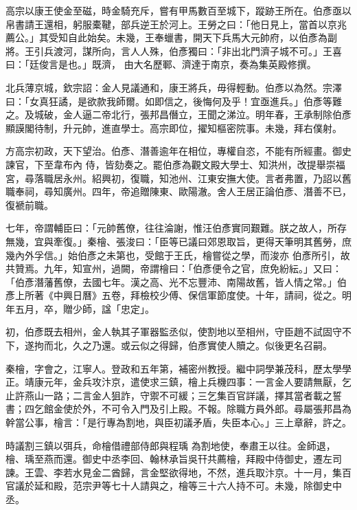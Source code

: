\begin{pinyinscope}
 高宗以康王使金至磁，時金騎充斥，嘗有甲馬數百至城下，蹤跡王所在。伯彥亟以帛書請王還相，躬服橐鞬，部兵逆王於河上。王勞之曰：「他日見上，當首以京兆薦公。」其受知自此始矣。未幾，王奉蠟書，開天下兵馬大元帥府，以伯彥為副將。王引兵渡河，謀所向，言人人殊，伯彥獨曰：「非出北門濟子城不可。」王喜曰：「廷俊言是也。」既濟，
 由大名歷鄆、濟達于南京，奏為集英殿修撰。



 北兵薄京城，欽宗詔：金人見議通和，康王將兵，毋得輕動。伯彥以為然。宗澤曰：「女真狂譎，是欲款我師爾。如即信之，後悔何及乎！宜亟進兵。」伯彥等難之。及城破，金人逼二帝北行，張邦昌僭立，王聞之涕泣。明年春，王承制除伯彥顯謨閣待制，升元帥，進直學士。高宗即位，擢知樞密院事。未幾，拜右僕射。



 方高宗初政，天下望治。伯彥、潛善逾年在相位，專權自恣，不能有所經畫。御史諫官，下至韋布內
 侍，皆劾奏之。罷伯彥為觀文殿大學士、知洪州，改提舉崇福宮，尋落職居永州。紹興初，復職，知池州、江東安撫大使。言者弗置，乃詔以舊職奉祠，尋知廣州。四年，帝追贈陳東、歐陽澈。舍人王居正論伯彥、潛善不已，復褫前職。



 七年，帝謂輔臣曰：「元帥舊僚，往往淪謝，惟汪伯彥實同艱難。朕之故人，所存無幾，宜與牽復。」秦檜、張浚曰：「臣等已議曰郊恩取旨，更得天筆明其舊勞，庶幾內外孚信。」始伯彥之未第也，受館于王氏，檜嘗從之學，而浚亦
 伯彥所引，故共贊焉。九年，知宣州，過闕，帝謂檜曰：「伯彥便令之官，庶免紛紜。」又曰：「伯彥潛藩舊僚，去國七年。漢之高、光不忘豐沛、南陽故舊，皆人情之常。」伯彥上所著《中興日曆》五卷，拜檢校少傅、保信軍節度使。十年，請祠，從之。明年五月，卒，贈少師，諡「忠定」。



 初，伯彥既去相州，金人執其子軍器監丞似，使割地以至相州，守臣趙不試固守不下，遂拘而北，久之乃還。或云似之得歸，伯彥實使人贖之。似後更名召嗣。



 秦檜，字會之，江寧人。登政和五年第，補密州教授。繼中詞學兼茂科，歷太學學正。靖康元年，金兵攻汴京，遣使求三鎮，檜上兵機四事：一言金人要請無厭，乞止許燕山一路；二言金人狙詐，守禦不可緩；三乞集百官詳議，擇其當者載之誓書；四乞館金使於外，不可令入門及引上殿。不報。除職方員外郎。尋屬張邦昌為幹當公事，檜言：「是行專為割地，與臣初議矛盾，失臣本心。」三上章辭，許之。



 時議割三鎮以弭兵，命檜借禮部侍郎與程瑀
 為割地使，奉肅王以往。金師退，檜、瑀至燕而還。御史中丞李回、翰林承旨吳幵共薦檜，拜殿中侍御史，遷左司諫。王雲、李若水見金二酋歸，言金堅欲得地，不然，進兵取汴京。十一月，集百官議於延和殿，范宗尹等七十人請與之，檜等三十六人持不可。未幾，除御史中丞。




\end{pinyinscope}
